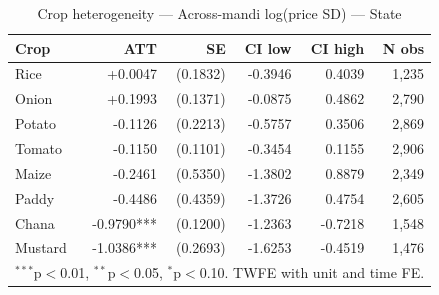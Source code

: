 \begin{table}[htbp]
\centering
\caption{Crop heterogeneity — Across-mandi log(price SD) — State}
\label{tab:spec3_across_state_crops}
\begin{tabular}{lrrrrr}
\hline\hline
Crop & ATT & SE & CI low & CI high & N obs \\
\hline
Rice & +0.0047 & (0.1832) & -0.3946 & 0.4039 & 1,235 \\
Onion & +0.1993 & (0.1371) & -0.0875 & 0.4862 & 2,790 \\
Potato & -0.1126 & (0.2213) & -0.5757 & 0.3506 & 2,869 \\
Tomato & -0.1150 & (0.1101) & -0.3454 & 0.1155 & 2,906 \\
Maize & -0.2461 & (0.5350) & -1.3802 & 0.8879 & 2,349 \\
Paddy & -0.4486 & (0.4359) & -1.3726 & 0.4754 & 2,605 \\
Chana & -0.9790*** & (0.1200) & -1.2363 & -0.7218 & 1,548 \\
Mustard & -1.0386*** & (0.2693) & -1.6253 & -0.4519 & 1,476 \\
\hline\hline
\multicolumn{6}{l}{\footnotesize $^{***}$p$<$0.01, $^{**}$p$<$0.05, $^{*}$p$<$0.10. TWFE with unit and time FE.} \\
\end{tabular}
\end{table}